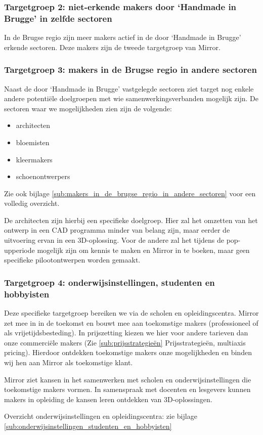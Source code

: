 \subsubsection{Targetgroep 2: niet-erkende makers door `Handmade in Brugge' in zelfde sectoren} %
\label{ssub:targetgroep-2}
In de Brugse regio zijn meer makers actief in de door `Handmade in Brugge' erkende sectoren. Deze makers zijn de tweede targetgroep van Mirror.
\subsubsection{Targetgroep 3: makers in de Brugse regio in andere sectoren} %
\label{ssub:targetgroep-3}
Naast de door `Handmade in Brugge' vastgelegde sectoren ziet target nog enkele andere potentiële doelgroepen met wie samenwerkingsverbanden mogelijk zijn. De sectoren waar we mogelijkheden zien zijn de volgende:

\begin{itemize}
  \item architecten
  \item bloemisten
  \item kleermakers
  \item schoenontwerpers
\end{itemize}

Zie ook bijlage \ref{sub:makers_in_de_brugse_regio_in_andere_sectoren} voor een volledig overzicht.

De architecten zijn hierbij een specifieke doelgroep. Hier zal het omzetten van het ontwerp in een CAD programma minder van belang zijn, maar eerder de uitvoering ervan in een 3D-oplossing. Voor de andere zal het tijdens de pop-upperiode mogelijk zijn om kennis te maken en Mirror in te boeken, maar geen specifieke pilootontwerpen worden gemaakt.

\subsubsection{Targetgroep 4: onderwijsinstellingen, studenten en hobbyisten} %
\label{ssub:targetgroep-4}
Deze specifieke targetgroep bereiken we via de scholen en opleidingscentra. Mirror zet mee in in de toekomst en bouwt mee aan toekomstige makers (professioneel of als vrijetijdsbesteding). In prijszetting kiezen we hier voor andere tarieven dan onze commerciële makers (Zie \ref{sub:prijsstrategieën} Prijsstrategieën, multiaxis pricing). Hierdoor ontdekken toekomstige makers onze mogelijkheden en binden wij hen aan Mirror als toekomstige klant.

Mirror ziet kansen in het samenwerken met scholen en onderwijsinstellingen die toekomstige makers vormen. In samenspraak met docenten en lesgevers kunnen makers in opleiding de kansen leren ontdekken van 3D-oplossingen.

Overzicht onderwijsinstellingen en opleidingscentra: zie bijlage \ref{sub:onderwijsinstellingen_studenten_en_hobbyisten}


